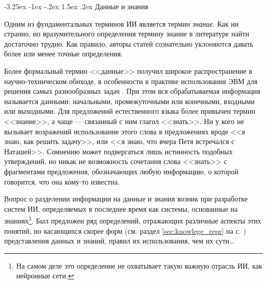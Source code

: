 \documentclass[12pt, openany, twoside]{book} %
\makeatletter
\renewcommand\section{\@startsection {section}{1}{\z@}%
                                   {-3.25ex \@plus -1ex \@minus -.2ex}%
                                   {1.5ex \@plus.2ex}%
                                   {\normalfont\large\bfseries}}
\makeatother
\begin{document}
\section{Данные и знания}

Одним из фундаментальных терминов ИИ является термин {\em знание}. Как ни странно, но вразумительного определения термину знание в литературе най\-ти достаточно трудно. Как правило, авторы статей сознательно уклоняются давать более или менее точные определения.

Более формальный термин <<данные>> получил широкое распространение в научно-техническом обиходе, в особенности в практике использования ЭВМ для решения самых разнообразных задач \cite{AIDictionary}. При этом вся обрабатываемая информация называется данными: началь\-ны\-ми, промежуточными или конечными, входными или выходными. Для предложений естественного языка более привычен термин <<знание>>, а чаще --- связанный с ним глагол <<знать>>. Ни у кого не вызывает возражений использование этого слова в предложениях вроде <<я знаю, как решить задачу>>, или <<я знаю, что вчера Петя встречался с Наташей>>. Сомнению может подвергаться лишь истинность подобных утверждений, но никак не возможность сочетания слова <<знать>> с фрагментами предложения, обозначающих любую информацию, о которой говорится, что она кому-то известна.

Вопрос о разделении информации на данные и знания возник при разработке систем ИИ, определяемых в последнее время как системы, основанные на знаниях\footnote{На самом деле это определение не охватывает такую важную отрасль ИИ, как нейронные сети.}. Был предложен ряд определений, отражающих различные аспекты этих понятий, но касающихся скорее форм (см. раздел \ref{sec:knowlege_repr} на с. \pageref{sec:knowlege_repr}) представления данных и знаний, правил их использования, чем их сути\ldots
\end{document}
